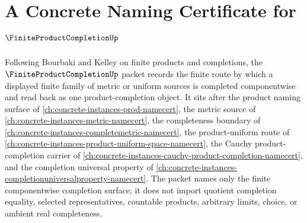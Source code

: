 \chapter{A Concrete Naming Certificate for $\FiniteProductCompletionUp$}
\label{ch:concrete-instances-finite-product-completion-namecert}

Following Bourbaki and Kelley on finite products and completions, the $\FiniteProductCompletionUp$ packet records the finite route by which a displayed finite family of metric or uniform sources is completed componentwise and read back as one product-completion object. It sits after the product naming surface of \autoref{ch:concrete-instances-prod-namecert}, the metric source of \autoref{ch:concrete-instances-metric-namecert}, the completeness boundary of \autoref{ch:concrete-instances-completemetric-namecert}, the product-uniform route of \autoref{ch:concrete-instances-product-uniform-space-namecert}, the Cauchy product-completion carrier of \autoref{ch:concrete-instances-cauchy-product-completion-namecert}, and the completion universal property of \autoref{ch:concrete-instances-completionuniversalproperty-namecert}. The packet names only the finite componentwise completion surface; it does not import quotient completion equality, selected representatives, countable products, arbitrary limits, choice, or ambient real completeness.

